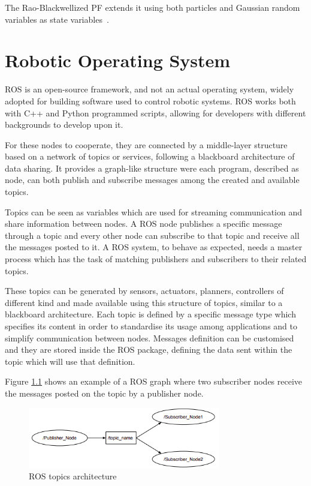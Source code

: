 The Rao-Blackwellized \gls{PF} extends it using both particles and Gaussian random variables as state variables~\cite{murphy_rao-blackwellised_2001}.




\chapter{Robotic Operating System}
\label{ch:ros}
\noindent \Gls{ROS}\cite{288} is an open-source framework, and not an actual operating system, widely adopted for building software used to control robotic systems.
\Gls{ROS} works both with C++ and Python programmed scripts, allowing for developers with different backgrounds to develop upon it.


For these nodes to cooperate, they are connected by a middle-layer structure based on a network of topics or services, following a blackboard architecture of data sharing.
It provides a graph-like structure were each program, described as node, can both publish and subscribe messages among the created and available topics.

Topics can be seen as variables which are used for streaming communication and share information between nodes.
A \Gls{ROS} node publishes a specific message through a topic and every other node can subscribe to that topic and receive all the messages posted to it.
A \Gls{ROS} system, to behave as expected, needs a master process which has the task of matching publishers and subscribers to their related topics.

These topics can be generated by sensors, actuators, planners, controllers of different kind and made available using this structure of topics, similar to a blackboard architecture.
Each topic is defined by a specific message type which specifies its content in order to standardise its usage among applications and to simplify communication between nodes.
Messages definition can be customised and they are stored inside the \Gls{ROS} package, defining the data sent within the topic which will use that definition.

Figure \ref{fig:ros-topic} shows an example of a \Gls{ROS} graph where two subscriber nodes receive the messages posted on the topic by a publisher node.

\begin{figure}[!ht]
	\begin{center}
		\includegraphics[width=0.75\textwidth]{Images/2-Background/ROSTopic-2021-04-22 10-51-37.png}
	\end{center}
	\caption{\Gls{ROS} topics architecture}%
	\label{fig:ros-topic}
\end{figure}

